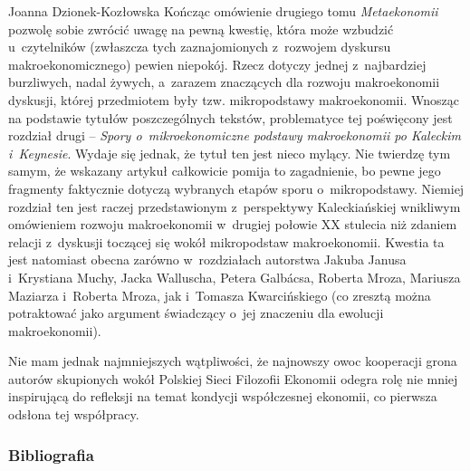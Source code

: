 \begin{recplenv}{Joanna Dzionek-Kozłowska}
Kończąc omówienie drugiego tomu \textit{Metaekonomii} pozwolę sobie zwrócić uwagę na pewną kwestię, która może wzbudzić
u~czytelników (zwłaszcza tych zaznajomionych z~rozwojem dyskursu makroekonomicznego) pewien niepokój. Rzecz dotyczy
jednej z~najbardziej burzliwych, nadal żywych, a~zarazem znaczących dla rozwoju makroekonomii dyskusji, której
przedmiotem były tzw. mikropodstawy makroekonomii. Wnosząc na podstawie tytułów poszczególnych tekstów, problematyce
tej poświęcony jest rozdział drugi -- \textit{Spory o~mikroekonomiczne podstawy makroekonomii po Kaleckim i~Keynesie}.
Wydaje się jednak, że tytuł ten jest nieco mylący. Nie twierdzę tym samym, że wskazany artykuł całkowicie pomija to
zagadnienie, bo pewne jego fragmenty faktycznie dotyczą wybranych etapów sporu o~mikropodstawy. Niemiej rozdział ten
jest raczej przedstawionym z~perspektywy Kaleckiańskiej wnikliwym omówieniem rozwoju makroekonomii w~drugiej połowie XX
stulecia niż zdaniem relacji z~dyskusji toczącej się wokół mikropodstaw makroekonomii. Kwestia ta jest natomiast obecna
zarówno w~rozdziałach autorstwa Jakuba Janusa i~Krystiana Muchy, Jacka Walluscha, Petera\textit{ }Galbácsa, Roberta
Mroza, Mariusza Maziarza i~Roberta Mroza, jak i~Tomasza Kwarcińskiego (co zresztą można potraktować jako argument
świadczący o~jej znaczeniu dla ewolucji makroekonomii).

Nie mam jednak najmniejszych wątpliwości, że najnowszy owoc kooperacji grona autorów skupionych wokół Polskiej Sieci
Filozofii Ekonomii odegra rolę nie mniej inspirującą do refleksji na temat kondycji współczesnej ekonomii, co pierwsza
odsłona tej współpracy. 









\subsubsection{Bibliografia}\nopagebreak[4]
\end{recplenv}
